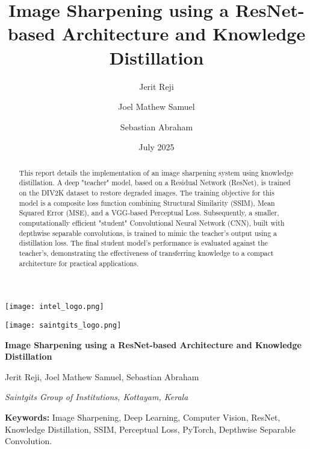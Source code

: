 \documentclass[12pt,a4paper]{article}
\title{Image Sharpening using a ResNet-based Architecture and Knowledge Distillation}
\author[1]{Jerit Reji}
\author[1]{Joel Mathew Samuel}
\author[1]{Sebastian Abraham}
\affil[1]{Saintgits Group of Institutions, Kottayam, Kerala}
\date{July 2025}
\begin{document}
\begin{titlepage}
    \thispagestyle{firstpage}
    
    \begin{minipage}{0.5\textwidth}
        \flushleft \texttt{[image: intel\_logo.png]}
    \end{minipage}%
    \begin{minipage}{0.5\textwidth}
        \flushright \texttt{[image: saintgits\_logo.png]}
    \end{minipage}
    
    \vfill 
    \centering
    {\Huge\bfseries Image Sharpening using a ResNet-based Architecture and Knowledge Distillation \par}
    \vspace{1.5cm} 
    {\Large Jerit Reji, Joel Mathew Samuel, Sebastian Abraham \par}
    \vspace{0.5cm}
    {\large \textit{Saintgits Group of Institutions, Kottayam, Kerala}\par}
    \vfill 
    
\end{titlepage}

\restoregeometry
\pagestyle{fancy} 

\begin{abstract}
\noindent This report details the implementation of an image sharpening system using knowledge distillation. A deep "teacher" model, based on a Residual Network (ResNet), is trained on the DIV2K dataset to restore degraded images. The training objective for this model is a composite loss function combining Structural Similarity (SSIM), Mean Squared Error (MSE), and a VGG-based Perceptual Loss. Subsequently, a smaller, computationally efficient "student" Convolutional Neural Network (CNN), built with depthwise separable convolutions, is trained to mimic the teacher's output using a distillation loss. The final student model's performance is evaluated against the teacher's, demonstrating the effectiveness of transferring knowledge to a compact architecture for practical applications.
\end{abstract}

\vspace{0.5cm}
\textbf{Keywords:} Image Sharpening, Deep Learning, Computer Vision, ResNet, Knowledge Distillation, SSIM, Perceptual Loss, PyTorch, Depthwise Separable Convolution.
\vspace{1cm}
\end{document}
